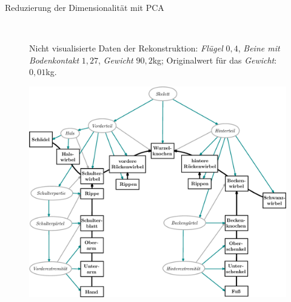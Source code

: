 \documentclass{beamer}
\begin{document}
\begin{frame}{Reduzierung der Dimensionalität mit PCA}
 \begin{figure}
  \centering
  ~
  
  \caption{Nicht visualisierte Daten der Rekonstruktion: \emph{Flügel} $0{,}4$, \emph{Beine mit Bodenkontakt} $1{,}27$, \emph{Gewicht} $90{,}2$kg; Originalwert für das \emph{Gewicht}: $0{,}01$kg.}
  \label{frosch}
 \end{figure}
\end{frame}

\begin{frame}
  \begin{figure}
   \includegraphics[height=0.9\textheight]{../graphics/grammarGraph_withoutLegend}
  \end{figure}
\end{frame}
\end{document}
